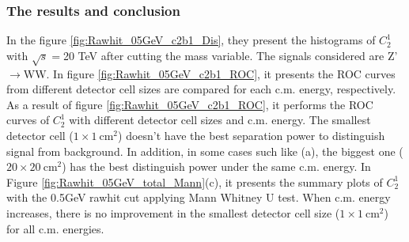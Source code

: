 \subsubsection{The results and conclusion}
In the figure \ref{fig:Rawhit_05GeV_c2b1_Dis}, they present the histograms of $C_{2}^{1}$ with $\sqrt{s}=$20 TeV after cutting the mass variable. The signals considered are Z'$\rightarrow$WW. In figure \ref{fig:Rawhit_05GeV_c2b1_ROC}, it presents the ROC curves from different detector cell sizes are compared for each c.m. energy, respectively. 
As a result of figure \ref{fig:Rawhit_05GeV_c2b1_ROC}, it performs the ROC curves of $C_{2}^{1}$ with different detector cell sizes and c.m. energy. The smallest detector cell ($1\times1~\mathrm{cm}^2$) doesn't have the best separation power to distinguish signal from background. In addition, in some cases such like (a), the biggest one ($20\times20~\mathrm{cm}^2$) has the best distinguish power under the same c.m. energy.
In Figure \ref{fig:Rawhit_05GeV_total_Mann}(c), it presents the summary plots of $C_{2}^{1}$ with the 0.5GeV rawhit cut applying Mann Whitney U test. When c.m. energy increases, there is no improvement in the smallest detector cell size ($1\times1~\mathrm{cm}^2$) for all c.m. energies. 

